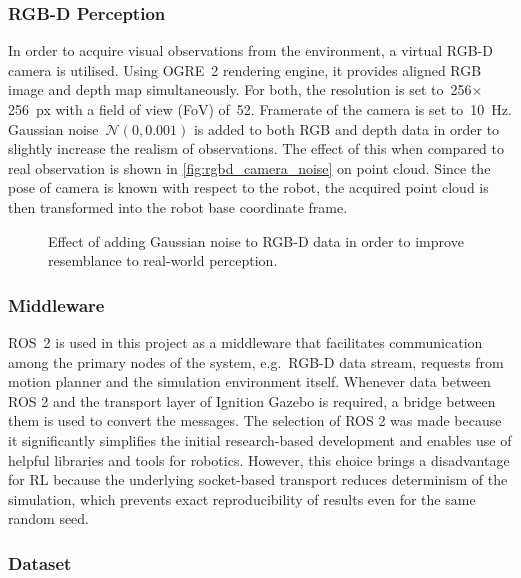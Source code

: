 \subsubsection{RGB-D Perception}

In order to acquire visual observations from the environment, a virtual RGB-D camera is utilised. Using OGRE~2 rendering engine, it provides aligned RGB image and depth map simultaneously. For both, the resolution is set to~256\({\times}\)256~px with a field of view (FoV) of~52\textdegree. Framerate of the camera is set to~10~Hz. Gaussian noise~\(\mathcal{N}(0, 0.001)\) is added to both RGB and depth data in order to slightly increase the realism of observations. The effect of this when compared to real observation is shown in \autoref{fig:rgbd_camera_noise} on point cloud. Since the pose of camera is known with respect to the robot, the acquired point cloud is then transformed into the robot base coordinate frame.

\begin{figure}[ht]
    \centering
    \caption{Effect of adding Gaussian noise to RGB-D data in order to improve resemblance to real-world perception.}
    \label{fig:rgbd_camera_noise}
\end{figure}


\subsubsection{Middleware}

ROS~2 is used in this project as a middleware that facilitates communication among the primary nodes of the system, e.g.~RGB-D data stream, requests from motion planner and the simulation environment itself. Whenever data between ROS 2 and the transport layer of Ignition Gazebo is required, a bridge between them is used to convert the messages. The selection of ROS 2 was made because it significantly simplifies the initial research-based development and enables use of helpful libraries and tools for robotics. However, this choice brings a disadvantage for RL because the underlying socket-based transport reduces determinism of the simulation, which prevents exact reproducibility of results even for the same random seed.


\subsubsection{Dataset}

